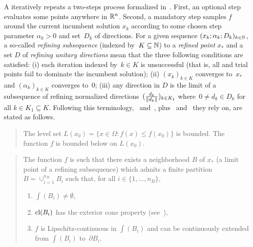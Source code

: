 A \ddsm iteratively repeats a two-steps process formalized in~\cite[Algorithm~2.1]{ViCu2012}.
First, an optional \search step evaluates some points anywhere in $\mathbb{R}^n$.
Second, a mandatory \poll step samples $f$ around the current incumbent solution $x_k$ according to some chosen step parameter $\alpha_k >0$ and set~$D_k$ of directions.
For a given sequence $(x_k;\alpha_k;D_k)_{k\in\mathbb{N}}$, a so-called \textit{refining subsequence} (indexed by~$K \subseteq \mathbb{N}$) to a \textit{refined point} $x_*$ and a set $D$ of \textit{refining unitary directions} mean that the three following conditions are satisfied: (i) each iteration indexed by~$k \in K$ is unsuccessful (that is, all \search and \poll trial points fail to dominate the incumbent solution); (ii) $(x_k)_{k \in K}$ converges to~$x_*$ and $(\alpha_k)_{k \in K}$ converges to~$0$; (iii) any direction in $D$ is the limit of a subsequence of refining normalized directions~$(\frac{d_k}{\left\lVert d_k\right\rVert})_{k \in K_1}$ where~$0 \neq d_k \in D_k$ for all $k \in K_1 \subseteq K$.
Following this terminology,~\cite[Theorem~4.1]{ViCu2012} and~\cite[Corollary~4.1]{ViCu2012}, plus~\cite[Assumption~2.1]{ViCu2012} and~\cite[Assumption~4.1]{ViCu2012} they rely on, are stated as follows.

\begin{quote}\textbf{\cite[Assumption~2.1]{ViCu2012}}
	The level set $L(x_0) = \{x \in \Omega : f(x) \leq f(x_0)\}$ is bounded.
	The function $f$ is bounded below on $L(x_0)$.
\end{quote}

\begin{quote}\textbf{\cite[Assumption~4.1]{ViCu2012}}
	The function $f$ is such that there exists a neighborhood $B$ of $x_*$ (a limit point of a refining subsequence) which admits a finite partition $B = \cup_{i=1}^{n_B} B_i$ such that, for all $i \in \{1, \dots, n_B\}$,
	\begin{enumerate}
		\item $\int(B_i) \neq \emptyset$,
		\item $\mathrm{cl}(B_i)$ has the exterior cone property (see~\cite[Definition~4.1]{ViCu2012}),
		\item $f$ is Lipschitz-continuous in $\int(B_i)$ and can be continuously extended from $\int(B_i)$ to~$\partial B_i$.
	\end{enumerate}
\end{quote}

